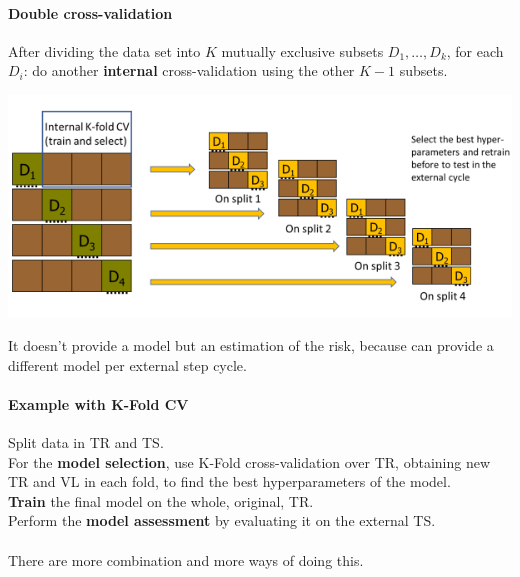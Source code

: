 \documentclass[10pt]{report}
\begin{document}
\paragraph{Double cross-validation} After dividing the data set into $K$ mutually exclusive subsets $D_1,\ldots, D_k$, for each $D_i$: do another \textbf{internal} cross-validation using the other $K-1$ subsets.
\begin{center}
	\includegraphics[scale=0.7]{13.png}
\end{center}
It doesn't provide a model but an estimation of the risk, because can provide a different model per external step cycle.
\paragraph{Example with K-Fold CV} Split data in TR and TS.\\
For the \textbf{model selection}, use K-Fold cross-validation over TR, obtaining new TR and VL in each fold, to find the best hyperparameters of the model.\\
\textbf{Train} the final model on the whole, original, TR.\\
Perform the \textbf{model assessment} by evaluating it on the external TS.\\\\
There are more combination and more ways of doing this.
\end{document}
